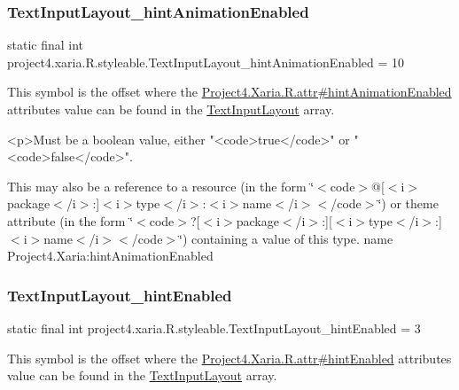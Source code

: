 \subsubsection{\texorpdfstring{Text\+Input\+Layout\+\_\+hint\+Animation\+Enabled}{TextInputLayout\_hintAnimationEnabled}}
{\footnotesize\ttfamily static final int project4.\+xaria.\+R.\+styleable.\+Text\+Input\+Layout\+\_\+hint\+Animation\+Enabled = 10\hspace{0.3cm}{\ttfamily [static]}}

This symbol is the offset where the \hyperlink{}{Project4.\+Xaria.\+R.\+attr\#hint\+Animation\+Enabled} attribute\textquotesingle{}s value can be found in the \hyperlink{classproject4_1_1xaria_1_1R_1_1styleable_a5a2e4611c17d75c805194b416b9fed74}{Text\+Input\+Layout} array.

\begin{DoxyVerb}      <p>Must be a boolean value, either "<code>true</code>" or "<code>false</code>".
\end{DoxyVerb}
 

This may also be a reference to a resource (in the form \char`\"{}$<$code$>$@\mbox{[}$<$i$>$package$<$/i$>$\+:\mbox{]}$<$i$>$type$<$/i$>$\+:$<$i$>$name$<$/i$>$$<$/code$>$\char`\"{}) or theme attribute (in the form \char`\"{}$<$code$>$?\mbox{[}$<$i$>$package$<$/i$>$\+:\mbox{]}\mbox{[}$<$i$>$type$<$/i$>$\+:\mbox{]}$<$i$>$name$<$/i$>$$<$/code$>$\char`\"{}) containing a value of this type.  name Project4.\+Xaria\+:hint\+Animation\+Enabled \mbox{\label{classproject4_1_1xaria_1_1R_1_1styleable_ad51c0cb02e0a3966e40c64db946ea60a}} 
\subsubsection{\texorpdfstring{Text\+Input\+Layout\+\_\+hint\+Enabled}{TextInputLayout\_hintEnabled}}
{\footnotesize\ttfamily static final int project4.\+xaria.\+R.\+styleable.\+Text\+Input\+Layout\+\_\+hint\+Enabled = 3\hspace{0.3cm}{\ttfamily [static]}}

This symbol is the offset where the \hyperlink{}{Project4.\+Xaria.\+R.\+attr\#hint\+Enabled} attribute\textquotesingle{}s value can be found in the \hyperlink{classproject4_1_1xaria_1_1R_1_1styleable_a5a2e4611c17d75c805194b416b9fed74}{Text\+Input\+Layout} array.

